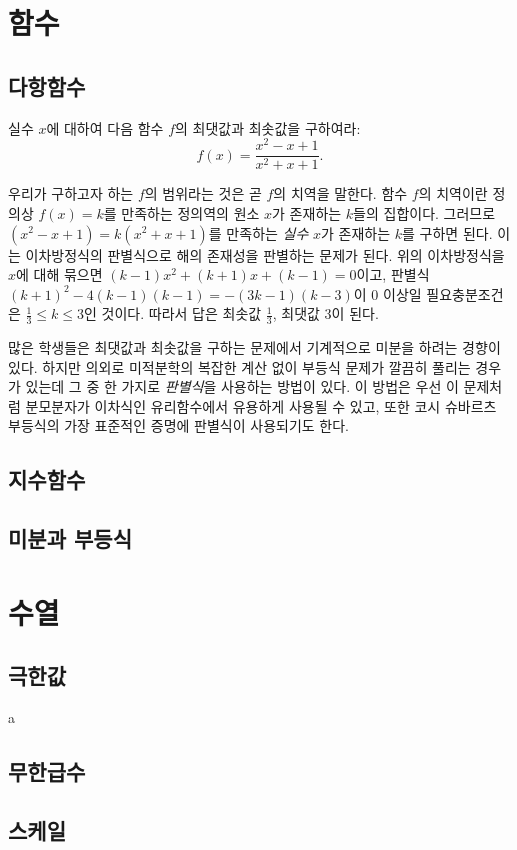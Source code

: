 \documentclass[11pt]{exam}
\begin{document}
\section{함수}
\begin{questions}

\subsection{다항함수}

\question 실수 $x$에 대하여 다음 함수 $f$의 최댓값과 최솟값을 구하여라:
\[f(x)=\frac{x^2-x+1}{x^2+x+1}.\]
\begin{sol}
우리가 구하고자 하는 $f$의 범위라는 것은 곧 $f$의 치역을 말한다.
함수 $f$의 치역이란 정의상 $f(x)=k$를 만족하는 정의역의 원소 $x$가 존재하는 $k$들의 집합이다.
그러므로 $(x^2-x+1)=k(x^2+x+1)$를 만족하는 \emph{실수} $x$가 존재하는 $k$를 구하면 된다.
이는 이차방정식의 판별식으로 해의 존재성을 판별하는 문제가 된다.
위의 이차방정식을 $x$에 대해 묶으면 $(k-1)x^2+(k+1)x+(k-1)=0$이고, 판별식 $(k+1)^2-4(k-1)(k-1)=-(3k-1)(k-3)$이 0 이상일 필요충분조건은 $\frac13\le k\le 3$인 것이다.
따라서 답은 최솟값 $\frac13$, 최댓값 3이 된다.

많은 학생들은 최댓값과 최솟값을 구하는 문제에서 기계적으로 미분을 하려는 경향이 있다.
하지만 의외로 미적분학의 복잡한 계산 없이 부등식 문제가 깔끔히 풀리는 경우가 있는데 그 중 한 가지로 \emph{판별식}을 사용하는 방법이 있다.
이 방법은 우선 이 문제처럼 분모분자가 이차식인 유리함수에서 유용하게 사용될 수 있고, 또한 코시 슈바르츠 부등식의 가장 표준적인 증명에 판별식이 사용되기도 한다.
\end{sol}





\subsection{지수함수}

\subsection{미분과 부등식}


\end{questions}
\section{수열}
\begin{questions}
\subsection{극한값}
\question a
\subsection{무한급수}

\subsection{스케일}


\end{questions}
\end{document}
